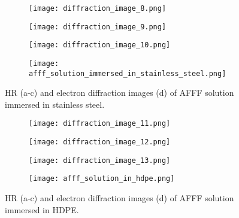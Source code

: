 \begin{figure}[H]
\centering

\begin{subfigure}{.45\textwidth}
    \texttt{[image: diffraction\_image\_8.png]}
\end{subfigure}
\hspace{-1em}
\begin{subfigure}{.45\textwidth}
    \texttt{[image: diffraction\_image\_9.png]}
\end{subfigure}
\par\bigskip
\begin{subfigure}{.45\textwidth}
    \texttt{[image: diffraction\_image\_10.png]}
\end{subfigure}
\hspace{-1em}
\begin{subfigure}{.45\textwidth}
    \texttt{[image: afff\_solution\_immersed\_in\_stainless\_steel.png]}
\end{subfigure}

\caption{HR (a-c) and electron diffraction images (d) of AFFF solution immersed in stainless steel.}
\label{ch5:figure:stainless_steel_images}
\end{figure}

\begin{figure}[H]
\centering

\begin{subfigure}{.45\textwidth}
    \texttt{[image: diffraction\_image\_11.png]}
\end{subfigure}
\hspace{-1em}
\begin{subfigure}{.45\textwidth}
    \texttt{[image: diffraction\_image\_12.png]}
\end{subfigure}
\par\bigskip
\begin{subfigure}{.45\textwidth}
    \texttt{[image: diffraction\_image\_13.png]}
\end{subfigure}
\hspace{-1em}
\begin{subfigure}{.45\textwidth}
    \texttt{[image: afff\_solution\_in\_hdpe.png]}
\end{subfigure}

\caption{HR (a-c) and electron diffraction images (d) of AFFF solution immersed in HDPE.}
\label{ch5:figure:hdpe_images}
\end{figure}

